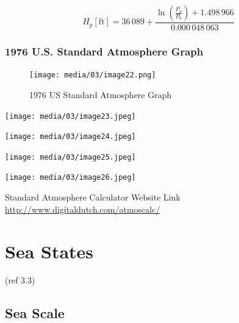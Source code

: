 \documentclass[
]{book}
\begin{document}
\[
H_p \left[ \text{ft} \right] = 36\,089+ \frac{ \ln \left( \frac{P_a}{P_0} \right) + 1.498\,966 }{ 0.000\,048\,063 }
\]

\hypertarget{u.s.-standard-atmosphere-graph}{%
\subsubsection*{1976 U.S. Standard Atmosphere Graph}\label{u.s.-standard-atmosphere-graph}}

\begin{figure}
\centering
\texttt{[image: media/03/image22.png]}
\caption{1976 US Standard Atmosphere Graph}
\end{figure}

\texttt{[image: media/03/image23.jpeg]}

\texttt{[image: media/03/image24.jpeg]}

\texttt{[image: media/03/image25.jpeg]}

\texttt{[image: media/03/image26.jpeg]}

Standard Atmosphere Calculator Website Link \url{http://www.digitaldutch.com/atmoscalc/}

\hypertarget{sea-states}{%
\section{Sea States}\label{sea-states}}

(ref 3.3)

\hypertarget{sea-scale}{%
\subsection*{Sea Scale}\label{sea-scale}}
\end{document}
